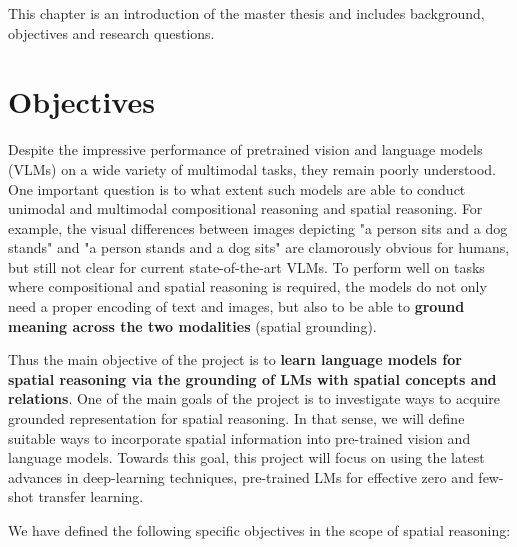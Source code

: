 This chapter is an introduction of the master thesis and includes background, objectives and research questions.

\section{Objectives}

Despite the impressive performance of pretrained vision and language models (VLMs) on a wide variety of multimodal tasks, they remain poorly understood. One important question is to what extent such models are able to conduct unimodal and multimodal compositional reasoning and spatial reasoning. For example, the visual differences between images depicting "a person sits and a dog stands" and "a person stands and a dog sits" are clamorously obvious for humans, but still not clear for current state-of-the-art VLMs. To perform well on tasks where compositional and spatial reasoning is required, the models do not only need a proper encoding of text and images, but also to be able to \textbf{ground meaning across the two modalities} (spatial grounding).

Thus the main objective of the project is to \textbf{learn language models for spatial reasoning via the grounding of LMs with spatial concepts and relations}. One of the main goals of the project is to investigate ways to acquire grounded representation for spatial reasoning. In that sense, we will define suitable ways to incorporate spatial information into pre-trained vision and language models. Towards this goal, this project will focus on using the latest advances in deep-learning techniques, pre-trained LMs for effective zero and few-shot transfer learning.

We have defined the following specific objectives in the scope of spatial reasoning:

